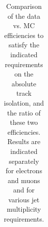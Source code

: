 \begin{table}[!ht]
\begin{center}
\begin{tabular}{l|c|c|c|c|c}
\hline
\hline

\end{tabular}
\caption{\label{tab:isotrk} Comparison of the data vs. MC efficiencies to satisfy the indicated requirements
on the absolute track isolation, and the ratio of these two efficiencies. Results are indicated separately for electrons and muons and for various
jet multiplicity requirements.}
\end{center}
\end{table}








